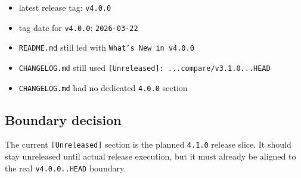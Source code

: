 \begin{itemize}
\tightlist
\item
  latest release tag: \texttt{v\allowbreak{}4\allowbreak{}.\allowbreak{}0\allowbreak{}.\allowbreak{}0}
\item
  tag date for \texttt{v\allowbreak{}4\allowbreak{}.\allowbreak{}0\allowbreak{}.\allowbreak{}0}: \texttt{2\allowbreak{}0\allowbreak{}2\allowbreak{}6\allowbreak{}-\allowbreak{}0\allowbreak{}3\allowbreak{}-\allowbreak{}2\allowbreak{}2}
\item
  \texttt{R\allowbreak{}E\allowbreak{}A\allowbreak{}D\allowbreak{}M\allowbreak{}E\allowbreak{}.\allowbreak{}m\allowbreak{}d} still led with \texttt{W\allowbreak{}h\allowbreak{}a\allowbreak{}t\allowbreak{}'\allowbreak{}s\allowbreak{} \allowbreak{}N\allowbreak{}e\allowbreak{}w\allowbreak{} \allowbreak{}i\allowbreak{}n\allowbreak{} \allowbreak{}v\allowbreak{}4\allowbreak{}.\allowbreak{}0\allowbreak{}.\allowbreak{}0}
\item
  \texttt{C\allowbreak{}H\allowbreak{}A\allowbreak{}N\allowbreak{}G\allowbreak{}E\allowbreak{}L\allowbreak{}O\allowbreak{}G\allowbreak{}.\allowbreak{}m\allowbreak{}d} still used \texttt{[\allowbreak{}U\allowbreak{}n\allowbreak{}r\allowbreak{}e\allowbreak{}l\allowbreak{}e\allowbreak{}a\allowbreak{}s\allowbreak{}e\allowbreak{}d\allowbreak{}]\allowbreak{}:\allowbreak{} \allowbreak{}.\allowbreak{}.\allowbreak{}.\allowbreak{}c\allowbreak{}o\allowbreak{}m\allowbreak{}p\allowbreak{}a\allowbreak{}r\allowbreak{}e\allowbreak{}/\allowbreak{}v\allowbreak{}3\allowbreak{}.\allowbreak{}1\allowbreak{}.\allowbreak{}0\allowbreak{}.\allowbreak{}.\allowbreak{}.\allowbreak{}H\allowbreak{}E\allowbreak{}A\allowbreak{}D}
\item
  \texttt{C\allowbreak{}H\allowbreak{}A\allowbreak{}N\allowbreak{}G\allowbreak{}E\allowbreak{}L\allowbreak{}O\allowbreak{}G\allowbreak{}.\allowbreak{}m\allowbreak{}d} had no dedicated \texttt{4\allowbreak{}.\allowbreak{}0\allowbreak{}.\allowbreak{}0} section
\end{itemize}

\subsection{Boundary decision}\label{record-204-boundary-decision}

The current \texttt{[\allowbreak{}U\allowbreak{}n\allowbreak{}r\allowbreak{}e\allowbreak{}l\allowbreak{}e\allowbreak{}a\allowbreak{}s\allowbreak{}e\allowbreak{}d\allowbreak{}]} section is the planned \texttt{4\allowbreak{}.\allowbreak{}1\allowbreak{}.\allowbreak{}0} release slice. It should stay unreleased until actual release execution, but it must already be aligned to the real \texttt{v\allowbreak{}4\allowbreak{}.\allowbreak{}0\allowbreak{}.\allowbreak{}0\allowbreak{}.\allowbreak{}.\allowbreak{}H\allowbreak{}E\allowbreak{}A\allowbreak{}D} boundary.


